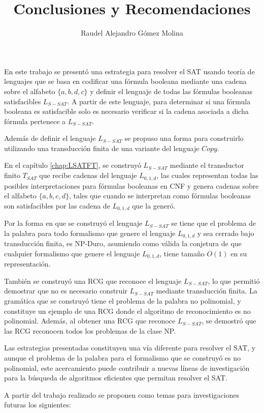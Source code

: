\documentclass[12pt]{article}
\title{Conclusiones y Recomendaciones}
\author{Raudel Alejandro Gómez Molina}
\begin{document}
\maketitle

En este trabajo se presentó una estrategia para resolver el SAT usando teoría de lenguajes que se basa en 
codificar una fórmula booleana mediante una cadena sobre el alfabeto $\{a,b,d,c\}$ y definir el lenguaje de 
todas las fórmulas booleanas satisfacibles $L_{S-SAT}$. A partir de este lenguaje, para determinar si una 
fórmula booleana es satisfacible solo es necesario verificar si la cadena asociada a dicha fórmula pertenece 
a $L_{S-SAT}$.

Además de definir el lenguaje $L_{S-SAT}$ se propuso una forma para construirlo utilizando una transducción 
finita de una variante del lenguaje $Copy$. 

En el capítulo \ref{chap:LSATFT}, se construyó $L_{S-SAT}$ mediante el transductor finito $T_{SAT}$ que 
recibe cadenas del lenguaje $L_{0,1,d}$, las cuales representan todas las posibles interpretaciones para 
fórmulas booleanas en CNF y genera cadenas sobre el alfabeto $\{a,b,c,d\}$, tales que cuando se interpretan 
como fórmulas booleanas son satisfacibles por las cadena de $L_{0,1,d}$ que la generó. 

Por la forma en que se construyó el lenguaje $L_{S-SAT}$ se tiene que el problema de la palabra para todo 
formalismo que genere el lenguaje $L_{0,1,d}$ y sea cerrado bajo transducción finita, es NP-Duro, asumiendo como válida 
la conjetura de que cualquier formalismo que genere el lenguaje $L_{0,1,d}$, tiene tamaño $O(1)$ en su 
representación.

También se construyó una RCG que reconoce el lenguaje $L_{S-SAT}$, lo que permitió demostrar que no es 
necesario construir $L_{S-SAT}$ mediante transducción finita. La gramática que se construyó tiene el 
problema de la palabra no polinomial, y constituye un ejemplo de una RCG donde el algoritmo de reconocimiento 
es no polinomial.  Además, al obtener una RCG que reconoce $L_{S-SAT}$, se demostró que las 
RCG reconocen todos los problemas de la clase NP.

Las estrategias presentadas constituyen una vía diferente para resolver el SAT, y aunque el problema de 
la palabra para el formalismo que se construyó es no polinomial, este acercamiento puede contribuir a nuevas 
líneas de investigación para la búsqueda de algoritmos eficientes que permitan resolver el SAT.

A partir del trabajo realizado se proponen como temas para investigaciones futuras los
siguientes:
\end{document}
